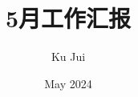 \documentclass[a4paper]{ctexart}
\begin{document}
	
	
	\title{\songti {}5月工作汇报}
	\author{\textrm{Ku Jui}}
	\date{\textrm{May 2024}}
	\maketitle
	
	\renewcommand{\figurename}{Figure} %
	
	\renewcommand{\tablename}{Table}
	
	\renewcommand{\cfttoctitlefont}{\hfill\Large\bfseries\songti}
	\renewcommand{\cftaftertoctitle}{\hfill}
	\renewcommand{\contentsname}{Content}
		
	\tableofcontents
	
	\newpage	
	
\end{document}
